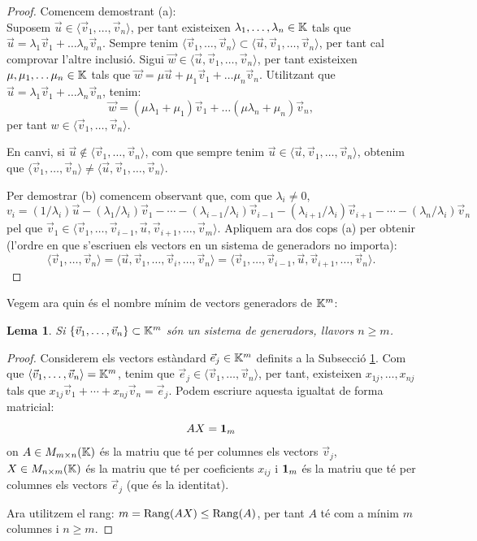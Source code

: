 \documentclass[
  11pt,
]{book}
\numberwithin{dummy}{section}
\theoremstyle{maincolornumbox}
\theoremstyle{blacknumex}
\theoremstyle{blacknumbox}
\theoremstyle{maincolornum}
\newtheorem{lemmaT}{Lema}[chapter]
\newenvironment{lemma}{\begin{pBox}\begin{lemmaT}}{\end{lemmaT}\end{pBox}}
\begin{document}
\begin{proof}
Comencem demostrant (a):\\
Suposem \(\vec u\in \langle \vec v_1, \dots , \vec v_n \rangle\), per tant
existeixen \(\lambda_1, \dots, \lambda_n\in\mathbb{K}\) tals que
\(\vec u=\lambda_1\vec v_1+\dots \lambda_n\vec v_n\). Sempre tenim
\(\langle \vec v_1, \dots , \vec v_n \rangle\subset\langle\vec u, \vec v_1, \dots , \vec v_n \rangle\),
per tant cal comprovar l'altre inclusió. Sigui
\(\vec w \in \langle\vec u, \vec v_1, \dots , \vec v_n \rangle\), per tant
existeixen \(\mu,\mu_1,\dots \mu_n\in\mathbb{K}\) tals que
\(\vec w=\mu \vec u+\mu_1\vec v_1+\dots \mu_n\vec v_n\). Utilitzant que
\(\vec u=\lambda_1\vec v_1+\dots \lambda_n\vec v_n\), tenim:
\[\vec w=(\mu\lambda_1+\mu_1)\vec v_1+\dots (\mu\lambda_n+\mu_n)\vec v_n ,\]
per tant \(w \in \langle \vec v_1, \dots , \vec v_n \rangle\).

En canvi, si \(\vec u\notin \langle \vec v_1, \dots , \vec v_n \rangle\),
com que sempre tenim
\(\vec u\in \langle\vec u, \vec v_1, \dots , \vec v_n \rangle\), obtenim
que
\(\langle \vec v_1, \dots , \vec v_n \rangle\neq\langle\vec u, \vec v_1, \dots , \vec v_n \rangle\).

Per demostrar (b) comencem observant que, com que \(\lambda_i\neq 0\),
\[v_i=(1/\lambda_i) \vec u -(\lambda_1/\lambda_i) \vec v_1- \cdots-(\lambda_{i-1}/\lambda_i) \vec v_{i-1} - (\lambda_{i+1}/\lambda_i) \vec v_{i+1} - \cdots -(\lambda_n/\lambda_i) \vec v_n\]
pel que
\(\vec v_1 \in \langle \vec v_1, \dots,\vec v_{i-1},\vec u , \vec v_{i+1},\dots,\vec v_m\rangle\).
Apliquem ara dos cops (a) per obtenir (l'ordre en que s'escriuen els
vectors en un sistema de generadors no importa):
\[\langle \vec v_1, \dots , \vec v_n\rangle=
    \langle \vec u,\vec v_1, \dots, \vec v_i, \dots , \vec v_n\rangle=
    \langle \vec v_1, \dots,\vec v_{i-1},\vec u , \vec v_{i+1},\dots,\vec v_n\rangle.\]
\end{proof}

Vegem ara quin és el nombre mínim de vectors generadors de \(\mathbb{K}^m\):

\begin{lemma}
\protect\hypertarget{lem:genKn}{}\label{lem:genKn}Si
\(\{\vec v_1, \dots, \vec v_n\}\subset \mathbb{K}^m\) són un sistema de
generadors, llavors \(n\geq m\).
\end{lemma}

\begin{proof}
Considerem els vectors estàndard \(\vec e_j\in\mathbb{K}^m\) definits a
la Subsecció \hyperref[subsec:matriusapl]{1}. Com que
\(\langle \vec v_1, \dots, \vec v_n \rangle=\mathbb{K}^m\), tenim que
\(\vec e_j \in \langle \vec v_1, \dots, \vec v_n \rangle\), per tant,
existeixen \(x_{1j}, \dots, x_{nj}\) tals que
\(x_{1j} \vec v_1+ \cdots+x_{nj}\vec v_n=\vec e_j\). Podem escriure
aquesta igualtat de forma matricial: \[A X = \mathbf{1}_m\] on
\(A \in M_{m\times n}(\mathbb{K})\) és la matriu que té per columnes els vectors
\(\vec v_j\), \(X\in M_{n\times m}(\mathbb{K})\) és la matriu que té per coeficients
\(x_{ij}\) i \(\mathbf{1}_m\) és la matriu que té per columnes els vectors
\(\vec e_j\) (que és la identitat).

Ara utilitzem el rang: \(m=\operatorname{Rang}(AX)\leq\operatorname{Rang}(A)\), per tant \(A\) té com a
mínim \(m\) columnes i \(n\geq m\).
\end{proof}
\end{document}
